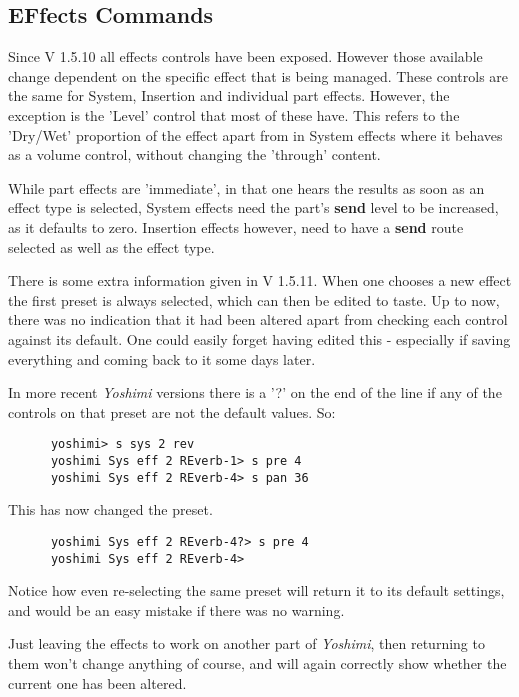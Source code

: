 \subsection{EFfects Commands}
\label{subsec:command_line_effects}
   Since V 1.5.10 all effects controls have been exposed. However those
   available change dependent on the specific effect that is being managed.
   These controls are the same for System, Insertion and individual part
   effects. However, the exception is the 'Level' control that most of these
   have. This refers to the 'Dry/Wet' proportion of the effect apart from in
   System effects where it behaves as a volume control, without changing the
   'through' content.

   While part effects are 'immediate', in that one hears the results as soon as
   an effect type is selected, System effects need the part's \textbf{send} level
   to be increased, as it defaults to zero. Insertion effects however, need to
   have a \textbf{send} route selected as well as the effect type.

   There is some extra information given in V 1.5.11.
   When one chooses a new effect the first preset is always selected, which can
   then be edited to taste. Up to now, there was no indication that it had
   been altered apart from checking each control against its default. One
   could easily forget having edited this - especially if saving everything and
   coming back to it some days later.

   In more recent \textsl{Yoshimi} versions there is a '?' on the end of the line if any of the
   controls on that preset are not the default values.
   So:
   \begin{verbatim}
      yoshimi> s sys 2 rev
      yoshimi Sys eff 2 REverb-1> s pre 4
      yoshimi Sys eff 2 REverb-4> s pan 36
   \end{verbatim}
   This has now changed the preset.
   \begin{verbatim}
      yoshimi Sys eff 2 REverb-4?> s pre 4
      yoshimi Sys eff 2 REverb-4>
   \end{verbatim}
   Notice how even re-selecting the same preset will return it to its default
   settings, and would be an easy mistake if there was no warning.

   Just leaving the effects to work on another part of \textsl{Yoshimi}, then
   returning to them won't change anything of course, and will again correctly
   show whether the current one has been altered.

